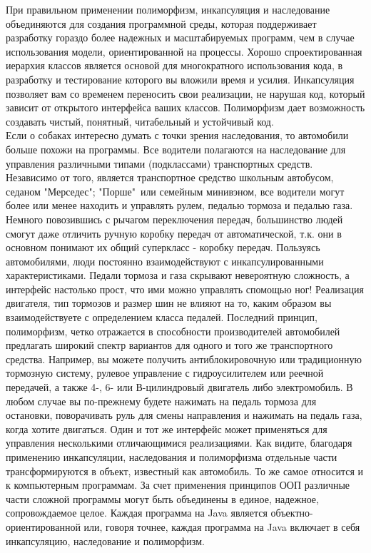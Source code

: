\noindent При правильном применении полиморфизм, инкапсуляция и наследование объединяются для создания программной среды, которая поддерживает разработку гораздо более надежных и масштабируемых программ, чем в случае использования модели, ориентированной на процессы. Хорошо спроектированная иерархия классов является основой для многократного использования кода, в разработку и тестирование которого вы вложили время и усилия. Инкапсуляция позволяет вам со временем переносить свои реализации, не нарушая код, который зависит от открытого интерфейса ваших классов. Полиморфизм дает возможность создавать чистый, понятный, читабельный и устойчивый код. \\
Если о собаках интересно думать с точки зрения наследования, то автомобили больше похожи на программы. Все водители полагаются на наследование для управления различными типами (подклассами) транспортных средств. Независимо от того, является транспортное средство школьным автобусом, седаном "Мерседес"; "Порше"\, или семейным минивэном, все водители могут более или менее находить и управлять рулем, педалью тормоза и педалью газа. Немного повозившись с рычагом переключения передач, большинство людей смогут даже отличить ручную коробку передач от автоматической, т.к. они в основном понимают их общий суперкласс - коробку передач. Пользуясь автомобилями, люди постоянно взаимодействуют с инкапсулированными характеристиками. Педали тормоза и газа скрывают невероятную сложность, а интерфейс настолько прост, что ими можно управлять спомощью ног! Реализация двигателя, тип тормозов и размер шин не влияют на то, каким образом вы взаимодействуете с определением класса педалей. Последний принцип, полиморфизм, четко отражается в способности производителей автомобилей предлагать широкий спектр вариантов для одного и того же транспортного средства. Например, вы можете получить антиблокировочную или традиционную тормозную систему, рулевое управление с гидроусилителем или реечной передачей, а также 4-, 6- или В-цилиндровый двигатель либо электромобиль. В любом случае вы по-прежнему будете нажимать на педаль тормоза для остановки, поворачивать руль для смены направления и нажимать на педаль газа, когда хотите двигаться. Один и тот же интерфейс может применяться для управления несколькими отличающимися реализациями. Как видите, благодаря применению инкапсуляции, наследования и полиморфизма отдельные части трансформируются в объект, известный как автомобиль. То же самое относится и к компьютерным программам. За счет применения принципов ООП различные части сложной программы могут быть объединены в единое, надежное, сопровождаемое целое. Каждая программа на Java является объектно-ориентированной или, говоря точнее, каждая программа на Java включает в себя инкапсуляцию, наследование и полиморфизм.
